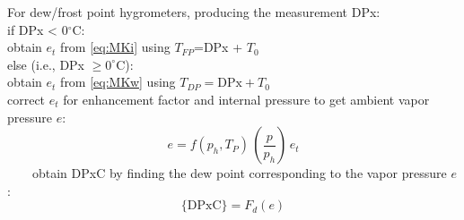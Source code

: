 \documentclass[
  english,
]{book}
\begin{document}
For dew/frost point hygrometers, producing the measurement DPx:\\
\hspace*{0.333em}\hspace*{0.333em}\hspace*{0.333em}\hspace*{0.333em}if DPx \textless{} 0\(^\circ\)C:\\
\hspace*{0.333em}\hspace*{0.333em}\hspace*{0.333em}\hspace*{0.333em}\hspace*{0.333em}\hspace*{0.333em}\hspace*{0.333em}\hspace*{0.333em}obtain \(e_{t}\) from \eqref{eq:MKi} using \(T_{FP}\)=DPx + \(T_{0}\)\\
\hspace*{0.333em}\hspace*{0.333em}\hspace*{0.333em}\hspace*{0.333em}else (i.e., DPx \(\geq 0^\circ\)C):\\
\hspace*{0.333em}\hspace*{0.333em}\hspace*{0.333em}\hspace*{0.333em}\hspace*{0.333em}\hspace*{0.333em}\hspace*{0.333em}\hspace*{0.333em}obtain \(e_{t}\) from \eqref{eq:MKw}
using \(T_{DP}=\mathrm{DPx}+T_{0}\)\\
\hspace*{0.333em}\hspace*{0.333em}\hspace*{0.333em}\hspace*{0.333em}correct \(e_{t}\) for enhancement factor and internal pressure
to get ambient vapor pressure \(e\):\\
\begin{equation}
e=f(p_{h},T_{P})\,(\frac{p}{p_{h}})\,e_t
\label{eq:ebox}
\end{equation}
~~~~obtain DPxC by finding the dew point corresponding to the
vapor pressure \(e\):\\
\begin{equation}
\mathrm{\{DPxC\}} = F_{d}(e) 
\label{eq:DPxCbox}
\end{equation}
\end{document}
